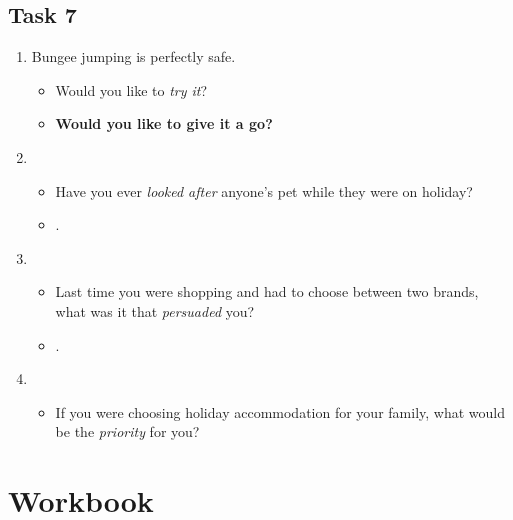 \documentclass[a4paper]{article}
\begin{document}
\subsection*{Task 7}
\begin{enumerate}
    \item Bungee jumping is perfectly safe. \begin{itemize}
        \item Would you like to \emph{try it}?
        \item \textbf{Would you like to give it a go?}
    \end{itemize}
    \item \begin{itemize}
        \item Have you ever \emph{looked after} anyone's pet while they were on holiday?
        \item .
    \end{itemize}
    \item \begin{itemize}
        \item Last time you were shopping and had to choose between two brands, what was it that \emph{persuaded} you?
        \item .
    \end{itemize}
    \item \begin{itemize}
        \item If you were choosing holiday accommodation for your family, what would be the \emph{priority} for you?
    \end{itemize}
\end{enumerate}
\section*{Workbook}
\end{document}
